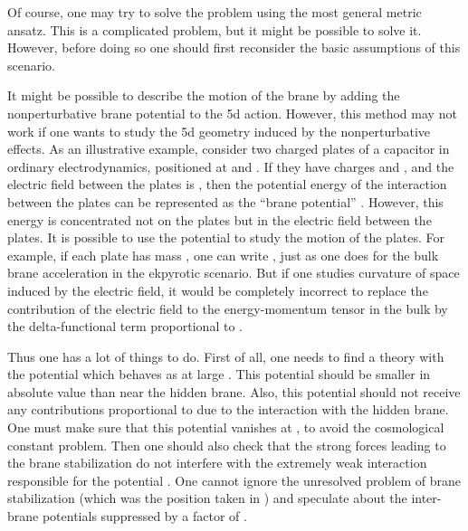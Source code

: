 \documentclass[a4paper,12pt]{article}
\begin{document}
Of course, one may try to solve the problem using the most general metric ansatz. This is a complicated problem, but it might be possible to solve it. However, before doing so one should first reconsider the basic assumptions of this scenario. 

It might be possible to describe the motion of the brane by adding the nonperturbative brane potential to the 5d action. However, this method may not work if one wants to study the 5d geometry induced by the nonperturbative effects. 
As an illustrative example, consider two charged plates of a capacitor in   
ordinary electrodynamics, positioned at \coordHE{} and \coordHE{}. If they have   
charges \coordHE{} and \coordHE{}, and the electric field between the plates is \coordHE{},   
then the potential energy of the interaction between the plates can be   
represented as the ``brane potential'' \coordHE{}. However, this energy is concentrated not on the plates but in the electric field between the plates. It is possible to use the potential \coordHE{} to study the motion of the plates. For example, if each plate has mass \coordHE{}, one can write \coordHE{}, just as one does for the bulk brane acceleration in the ekpyrotic scenario. But if one studies curvature of space induced by the electric field, it would be completely incorrect to replace the contribution of the electric field to the energy-momentum tensor in the bulk by the delta-functional term proportional to \coordHE{}.  

   
Thus  one has  a lot of things to do. First of all, one needs to find a   
theory with the potential \coordHE{} which behaves as \coordHE{} at   
large \coordHE{}. This potential should be   
smaller in absolute value than \coordHE{} near the hidden brane. Also, this potential should not receive any contributions   
proportional to \coordHE{} due to the interaction with the   
hidden brane.  One must make sure that this potential vanishes at \coordHE{}, to avoid the cosmological constant problem. Then one    
should also check that the strong forces leading to the brane   
stabilization do not interfere with the extremely weak interaction   
responsible for the potential \coordHE{}. One cannot ignore the   
unresolved problem of brane stabilization (which was the position taken in   
\cite{KOST}) and speculate about the inter-brane potentials suppressed by   
a factor of \coordHE{}.   
   
\end{document}
